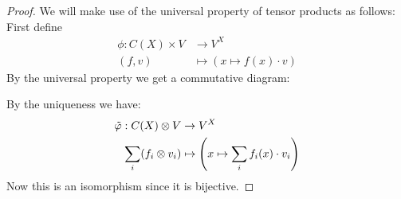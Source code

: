 \begin{proof}
	We will make use of the universal property of tensor products as follows: First define
	\begin{align*}
		\phi: C(X)\times V & \to V^X\\
		(f,v)              & \mapsto \left(x\mapsto f(x)\cdot v \right)
	\end{align*} 
	By the universal property we get a commutative diagram: %
	By the uniqueness we have:
	\begin{align*}
		\Tilde{\phi}: C(X)\otimes V & \to V^X\\
		\sum_i(f_i\otimes v_i)      & \mapsto \left(x\mapsto \sum_i f_i(x)\cdot v_i \right)
	\end{align*} Now this is an isomorphism since it is bijective.
	
\end{proof}
